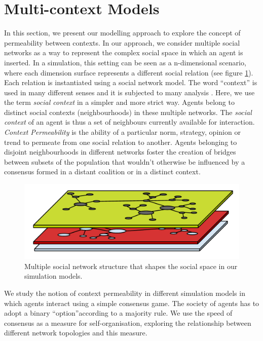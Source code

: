 \documentclass[preprint,number]{elsarticle}
\begin{document}
	
	\section{Multi-context Models}
	\label{sec:multi-context-models} 
	In this section, we present our modelling approach to explore the concept of permeability between contexts. In our approach, we consider multiple social networks as a way to represent the complex social space in which an agent is inserted. In a simulation, this setting can be seen as a n-dimensional scenario, where each dimension surface represents a different social relation (see figure \ref{img:multiple-relations}). Each relation is instantiated using a social network model. The word ``context'' is used in many different senses and it is subjected to many analysis \cite{Hayes1997}. Here, we use the term \textit{social context} in a simpler and more strict way. Agents belong to distinct social contexts (neighbourhoods) in these multiple networks. The \textit{social context} of an agent is thus a set of neighbours currently available for interaction. \textit{Context Permeability} is the ability of a particular norm, strategy, opinion or trend to permeate from one social relation to another. Agents belonging to disjoint neighbourhoods in different networks foster the creation of bridges between subsets of the population that wouldn't otherwise be influenced by a consensus formed in a distant coalition or in a distinct context. 
	
	
	
	\begin{figure}[h]
		\centering
		\includegraphics[width=0.7\linewidth]{./images/multi-context_model.pdf}
		\begin{minipage}{0.9\linewidth}
			\caption{Multiple social network structure that shapes the social space in our simulation models.}
			\label{img:multiple-relations}
		\end{minipage}
	\end{figure}
	
	We study the notion of context permeability in different simulation models in which agents interact using a simple consensus game. The society of agents has to adopt a binary \textquotedblleft option\textquotedblright according to a majority rule. We use the speed of consensus as a measure for self-organisation, exploring the relationship between different network topologies and this measure.
	
\end{document}
